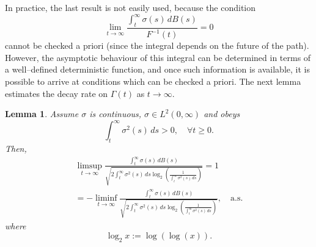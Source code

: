 \documentclass[a4paper,10pt,reqno]{amsart}
\numberwithin{equation}{section}
\newtheorem{lemma}{Lemma}
\theoremstyle{definition}
\theoremstyle{remark}
\DeclareMathOperator{\1}{\mathbbm 1}
\begin{document}
	In practice, the last result is not easily used, because the condition 
	\[
	\lim_{t\to\infty} \frac{\int_t^\infty \sigma(s)\,dB(s)}{F^{-1}(t)}=0
	\]
	cannot be checked a priori (since the integral depends on the future of the path). However, the asymptotic behaviour of this integral can be determined in terms of a well--defined deterministic function, and once such information is available, it is possible to arrive at conditions which can be checked a priori. The next lemma estimates the decay rate on $\Gamma(t)$ as $t\to\infty$.
	
	\begin{lemma} \label{lemma.tailmartasy} Assume $\sigma$ is continuous, $\sigma \in L^2(0, \infty)$ and obeys
		\begin{equation} \label{d}
			\int_t^\infty \sigma^2(s) \, ds > 0, \quad \forall t \geq 0.
		\end{equation}
		Then,
		\begin{multline*}
			\limsup_{t \to \infty} \frac{\int_t^\infty \sigma(s) \, dB(s)}{\sqrt{2 \int_t^\infty \sigma^2(s) \, ds \log_2 \left( \frac{1}{\int_t^\infty \sigma^2(s) \, ds} \right)}} = 1\\
			= -\liminf_{t \to \infty} \frac{ \int_t^\infty \sigma(s) \, dB(s)}{\sqrt{2 \int_t^\infty \sigma^2(s) \, ds \log_2 \left( \frac{1}{\int_t^\infty \sigma^2(s) \, ds} \right)}}, \quad \text{a.s.}
		\end{multline*}
		where
		\[
		\log_2 x := \log(\log(x)).
		\]
	\end{lemma}
\end{document}
